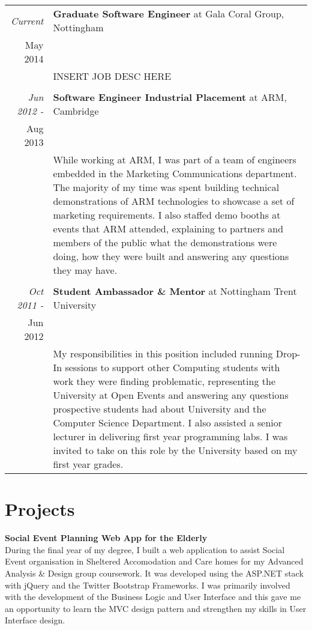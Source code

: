 \documentclass[a4paper,10pt]{article} %
\begin{document}
\begin{longtable}{r|p{16cm}}
\emph{Current} & \textbf{Graduate Software Engineer} at Gala Coral Group, Nottingham \\
May 2014 & \\
& INSERT JOB DESC HERE \\
\multicolumn{2}{c}{} \\

\emph{Jun 2012 -} & \textbf{Software Engineer Industrial Placement} at ARM, Cambridge \\
Aug 2013 & \\
& While working at ARM, I was part of a team of engineers embedded in the Marketing Communications department. The majority of my time was spent building technical demonstrations of ARM technologies to showcase a set of marketing requirements. I also staffed demo booths at events that ARM attended, explaining to partners and members of the public what the demonstrations were doing, how they were built and answering any questions they may have. \\
\multicolumn{2}{c}{} \\

\emph{Oct 2011 -} & \textbf{Student Ambassador \& Mentor} at Nottingham Trent University \\
Jun 2012 & \\
& My responsibilities in this position included running Drop-In sessions to support other Computing students with work they were finding problematic, representing the University at Open Events and answering any questions prospective students had about University and the Computer Science Department. I also assisted a senior lecturer in delivering first year programming labs. I was invited to take on this role by the University based on my first year grades. \\

\end{longtable}
\pagebreak
\section{Projects}
\textbf{Social Event Planning Web App for the Elderly} \\
During the final year of my degree, I built a web application to assist Social Event organisation in Sheltered Accomodation and Care homes for my Advanced Analysis \& Design group coursework. It was developed using the ASP.NET stack with jQuery and the Twitter Bootstrap Frameworks. I was primarily involved with the development of the Business Logic and User Interface and this gave me an opportunity to learn the MVC design pattern and strengthen my skills in User Interface design. \\
\par
\end{document}

